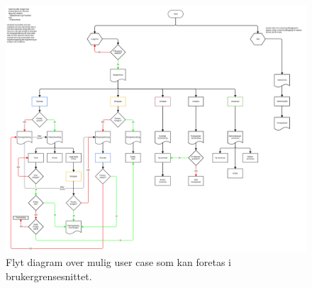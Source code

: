 \begin{figure}[ht]
 \includegraphics[angle=90 ,width=\textwidth,height=\textheight,keepaspectratio]{./img/appendix/diagram/user_case.png}
 \caption{Flyt diagram over mulig user case som kan foretas i brukergrensesnittet.}
 \label{fig:user_case}
\end{figure}



